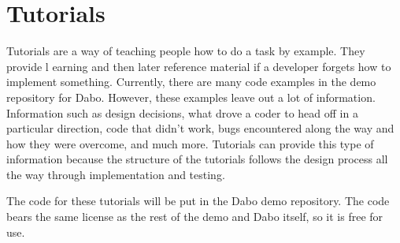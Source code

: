 
\newpage
\part{Tutorials}

Tutorials are a way of teaching people how to do a task by example.  They provide l
earning and then later reference material if a developer forgets how to implement 
something.  Currently, there are many code examples in the demo repository for Dabo.  
However, these examples leave out a lot of information.  Information such as design 
decisions, what drove a coder to head off in a particular direction, code that didn't 
work, bugs encountered along the way and how they were overcome, and much 
more.  Tutorials can provide this type of information because the structure of the 
tutorials follows the design process all the way through implementation and testing.

The code for these tutorials will be put in the Dabo demo repository.  The code 
bears the same license as the rest of the demo and Dabo itself, so it is free for use.

\newpage


